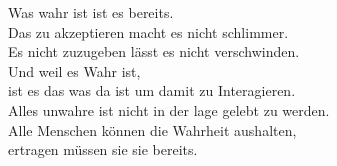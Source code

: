 \begin{frame}[c]
    \large
    Was wahr ist ist es bereits. \\
    Das zu akzeptieren macht es nicht schlimmer. \\
    Es nicht zuzugeben lässt es nicht verschwinden. \\
    Und weil es Wahr ist, \\
    ist es das was da ist um damit zu Interagieren. \\
    Alles unwahre ist nicht in der lage gelebt zu werden. \\
    Alle Menschen können die Wahrheit aushalten, \\
    ertragen müssen sie sie bereits.
\end{frame}














